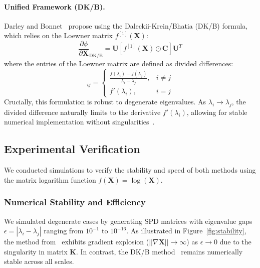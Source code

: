 \documentclass{article}
\begin{document}
\begin{appendices}
  \paragraph{Unified Framework (DK/B).}
  Darley and Bonnet~\cite{darley2024unified} propose using the Daleckii-Krein/Bhatia (DK/B) formula, which relies on the Loewner matrix $f^{[1]}(\mathbf{X})$:
  \begin{equation}
    \frac{\partial \phi}{\partial \mathbf{X}}_{\text{DK/B}} = \mathbf{U} \left[ f^{[1]}(\mathbf{X}) \odot \mathbf{C} \right] \mathbf{U}^T
  \end{equation}
  where the entries of the Loewner matrix are defined as divided differences:
  \begin{equation}
    [f^{[1]}(\mathbf{X})]_{ij} =
    \begin{cases}
      \frac{f(\lambda_i) - f(\lambda_j)}{\lambda_i - \lambda_j}, & i \neq j \\
      f'(\lambda_i), & i = j
    \end{cases}
  \end{equation}
  Crucially, this formulation is robust to degenerate eigenvalues. As $\lambda_i \to \lambda_j$, the divided difference naturally limits to the derivative $f'(\lambda_i)$, allowing for stable numerical implementation without singularities~\cite{darley2024unified}.

  \subsection{Experimental Verification}

  We conducted simulations to verify the stability and speed of both methods using the matrix logarithm function $f(\mathbf{X}) = \log(\mathbf{X})$.

  \subsubsection{Numerical Stability and Efficiency}
  We simulated degenerate cases by generating SPD matrices with eigenvalue gaps $\epsilon = |\lambda_i - \lambda_j|$ ranging from $10^{-1}$ to $10^{-16}$.
  As illustrated in Figure~\ref{fig:stability}, the method from~\cite{ionescu2015matrix} exhibits gradient explosion ($||\nabla \mathbf{X}|| \to \infty$) as $\epsilon \to 0$ due to the singularity in matrix $\mathbf{K}$. In contrast, the DK/B method~\cite{darley2024unified} remains numerically stable across all scales.


\end{appendices}
\end{document}
